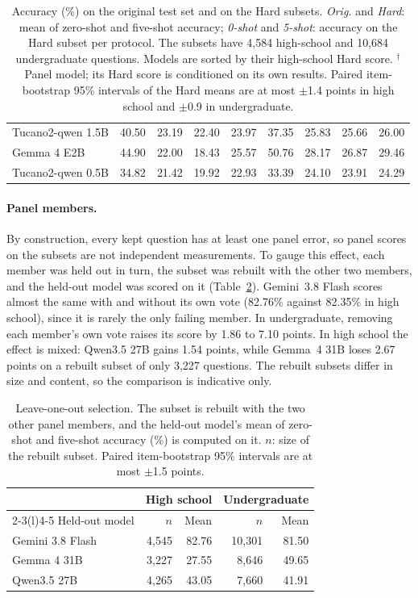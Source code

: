 \begin{table}[t]
\begin{tabular}{@{}lrrrrrrrr@{}}
Tucano2-qwen 1.5B & 40.50 & 23.19 & 22.40 & 23.97 & 37.35 & 25.83 & 25.66 & 26.00 \\
Gemma 4 E2B & 44.90 & 22.00 & 18.43 & 25.57 & 50.76 & 28.17 & 26.87 & 29.46 \\
Tucano2-qwen 0.5B & 34.82 & 21.42 & 19.92 & 22.93 & 33.39 & 24.10 & 23.91 & 24.29 \\
\bottomrule
\end{tabular}
\caption{Accuracy (\%) on the original test set and on the Hard subsets.
\emph{Orig.} and \emph{Hard}: mean of zero-shot and five-shot accuracy;
\emph{0-shot} and \emph{5-shot}: accuracy on the Hard subset per protocol.
The subsets have 4,584 high-school and 10,684 undergraduate questions. Models
are sorted by their high-school Hard score. $^\dagger$Panel model; its Hard
score is conditioned on its own results. Paired item-bootstrap 95\%
intervals of the Hard means are at most $\pm$1.4 points in high school and
$\pm$0.9 in undergraduate.}
\label{tab:hard-scores}
\end{table}

\paragraph{Panel members.} By construction, every kept question has at least
one panel error, so panel scores on the subsets are not independent
measurements. To gauge this effect, each member was held out in turn, the
subset was rebuilt with the other two members, and the held-out model was
scored on it (Table~\ref{tab:hard-loo}). Gemini~3.8 Flash scores almost the
same with and without its own vote (82.76\% against 82.35\% in high school),
since it is rarely the only failing member. In undergraduate, removing each
member's own vote raises its score by 1.86 to 7.10 points. In high school the
effect is mixed: Qwen3.5 27B gains 1.54 points, while Gemma~4 31B loses 2.67
points on a rebuilt subset of only 3,227 questions. The rebuilt subsets
differ in size and content, so the comparison is indicative only.

\begin{table}[t]
\centering
\footnotesize
\setlength{\tabcolsep}{3.5pt}
\begin{tabular}{@{}lrrrr@{}}
\toprule
& \multicolumn{2}{c}{High school} & \multicolumn{2}{c}{Undergraduate} \\
\cmidrule(lr){2-3}\cmidrule(l){4-5}
Held-out model & $n$ & Mean & $n$ & Mean \\
\midrule
Gemini 3.8 Flash & 4,545 & 82.76 & 10,301 & 81.50 \\
Gemma 4 31B & 3,227 & 27.55 & 8,646 & 49.65 \\
Qwen3.5 27B & 4,265 & 43.05 & 7,660 & 41.91 \\
\bottomrule
\end{tabular}
\caption{Leave-one-out selection. The subset is rebuilt with the two other
panel members, and the held-out model's mean of zero-shot and five-shot
accuracy (\%) is computed on it. $n$: size of the rebuilt subset. Paired
item-bootstrap 95\% intervals are at most $\pm$1.5 points.}
\label{tab:hard-loo}
\end{table}

